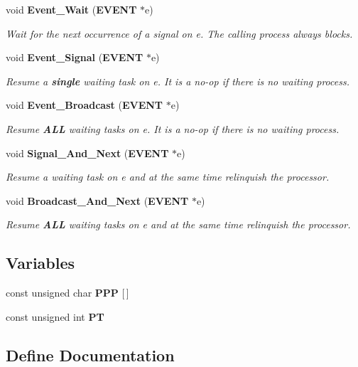 \begin{CompactItemize}
void {\bf Event\_\-Wait} ({\bf EVENT} $\ast$e)
\begin{CompactList}\small\item\em Wait for the next occurrence of a signal on {\em e\/}. The calling process always blocks. \item\end{CompactList}\item 
void {\bf Event\_\-Signal} ({\bf EVENT} $\ast$e)
\begin{CompactList}\small\item\em Resume a {\bf single} waiting task on {\em e\/}. It is a {\em no-op\/} if there is no waiting process. \item\end{CompactList}\item 
void {\bf Event\_\-Broadcast} ({\bf EVENT} $\ast$e)
\begin{CompactList}\small\item\em Resume {\bf ALL} waiting tasks on {\em e\/}. It is a {\em no-op\/} if there is no waiting process. \item\end{CompactList}\item 
void {\bf Signal\_\-And\_\-Next} ({\bf EVENT} $\ast$e)
\begin{CompactList}\small\item\em Resume a waiting task on {\em e\/} and at the same time relinquish the processor. \item\end{CompactList}\item 
void {\bf Broadcast\_\-And\_\-Next} ({\bf EVENT} $\ast$e)
\begin{CompactList}\small\item\em Resume {\bf ALL} waiting tasks on {\em e\/} and at the same time relinquish the processor. \item\end{CompactList}\end{CompactItemize}
\subsection*{Variables}
\begin{CompactItemize}
\item 
const unsigned char {\bf PPP} [$\,$]
\item 
const unsigned int {\bf PT}
\end{CompactItemize}


\subsection{Define Documentation}
